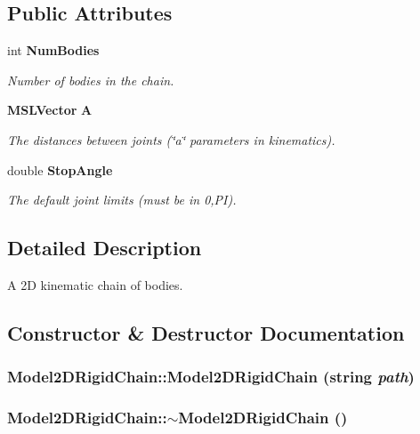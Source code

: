 \subsection*{Public Attributes}
\begin{CompactItemize}
\item 
int {\bf Num\-Bodies}
\begin{CompactList}\small\item\em Number of bodies in the chain.\item\end{CompactList}\item 
{\bf MSLVector} {\bf A}
\begin{CompactList}\small\item\em The distances between joints (\char`\"{}a\char`\"{} parameters in kinematics).\item\end{CompactList}\item 
double {\bf Stop\-Angle}
\begin{CompactList}\small\item\em The default joint limits (must be in 0,PI).\item\end{CompactList}\end{CompactItemize}


\subsection{Detailed Description}
A 2D kinematic chain of bodies.



\subsection{Constructor \& Destructor Documentation}
\subsubsection{\setlength{\rightskip}{0pt plus 5cm}Model2DRigid\-Chain::Model2DRigid\-Chain (string {\em path})}\label{class_Model2DRigidChain_a0}


\subsubsection{\setlength{\rightskip}{0pt plus 5cm}Model2DRigid\-Chain::$\sim$Model2DRigid\-Chain ()\hspace{0.3cm}{\tt  [inline, virtual]}}\label{class_Model2DRigidChain_a1}




